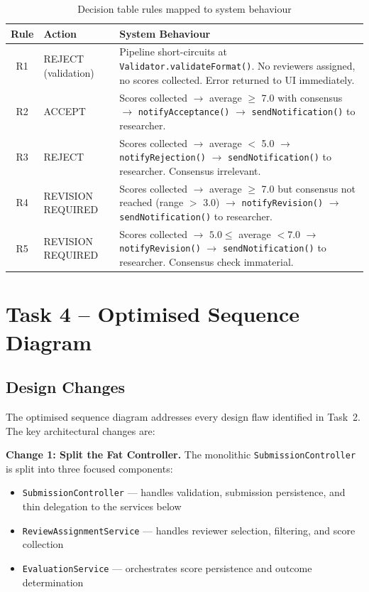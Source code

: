 \documentclass[12pt, a4paper]{article}
\begin{document}
\begin{table}[H]
\centering
\caption{Decision table rules mapped to system behaviour}
\label{tab:rule-behaviour}
\begin{tabularx}{\textwidth}{c l X}
    \toprule
    \textbf{Rule} & \textbf{Action} & \textbf{System Behaviour} \\
    \midrule
    R1 & REJECT (validation) & Pipeline short-circuits at \texttt{Validator.validateFormat()}. No reviewers assigned, no scores collected. Error returned to UI immediately. \\
    R2 & ACCEPT & Scores collected $\rightarrow$ average $\geq$ 7.0 with consensus $\rightarrow$ \texttt{notifyAcceptance()} $\rightarrow$ \texttt{sendNotification()} to researcher. \\
    R3 & REJECT & Scores collected $\rightarrow$ average $<$ 5.0 $\rightarrow$ \texttt{notifyRejection()} $\rightarrow$ \texttt{sendNotification()} to researcher. Consensus irrelevant. \\
    R4 & REVISION REQUIRED & Scores collected $\rightarrow$ average $\geq$ 7.0 but consensus not reached (range $>$ 3.0) $\rightarrow$ \texttt{notifyRevision()} $\rightarrow$ \texttt{sendNotification()} to researcher. \\
    R5 & REVISION REQUIRED & Scores collected $\rightarrow$ $5.0 \leq$ average $< 7.0$ $\rightarrow$ \texttt{notifyRevision()} $\rightarrow$ \texttt{sendNotification()} to researcher. Consensus check immaterial. \\
    \bottomrule
\end{tabularx}
\end{table}

\section{Task 4 -- Optimised Sequence Diagram}
\label{sec:task4}

\subsection{Design Changes}

The optimised sequence diagram addresses every design flaw identified in Task~2. The key architectural changes are:

\textbf{Change 1: Split the Fat Controller.}
The monolithic \texttt{SubmissionController} is split into three focused components:
\begin{itemize}[nosep]
    \item \texttt{SubmissionController} --- handles validation, submission persistence, and thin delegation to the services below
    \item \texttt{ReviewAssignmentService} --- handles reviewer selection, filtering, and score collection
    \item \texttt{EvaluationService} --- orchestrates score persistence and outcome determination
\end{itemize}
\end{document}
